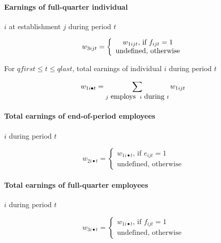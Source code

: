 \paragraph{Earnings of full-quarter individual}

$i$ at establishment $j$ during period $t$

\begin{equation}
w_{3ijt} = \left\{ \begin{array}{*{20}c} {w_{1ijt} \mbox{, if }f_{ijt} = 1}
\\ {\mbox{undefined, otherwise}} \\ \end{array}\right.
\end{equation}

For $qfirst \leq t \leq qlast$, total earnings of individual $i$ during
period $t$

\begin{equation}
w_{1i\bullet t} = \sum\limits_{j\mbox{ employs}\;\mbox{ }i\mbox{ during }t} {%
w_{1ijt} }
\end{equation}

\paragraph{Total earnings of end-of-period employees}

$i$ during period $t$

\begin{equation}
w_{2i\bullet t} = \left\{ 
\begin{array}{l}
{w_{1i\bullet t} \mbox{,
if }e_{ijt} = 1} \\ 
{\mbox{undefined, otherwise}}%
\end{array}%
\right.
\end{equation}

\paragraph{Total earnings of full-quarter employees}

$i$ during period $t$

\begin{equation}
w_{3i\bullet t} = \left\{ 
\begin{array}{l}
{w_{1i\bullet t} \mbox{,
if }f_{ijt} = 1} \\ 
{\mbox{undefined, otherwise}}%
\end{array}%
\right.
\end{equation}


